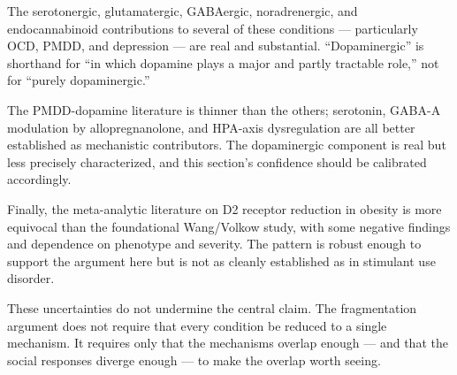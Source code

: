 The serotonergic, glutamatergic, GABAergic, noradrenergic, and endocannabinoid contributions to several of these conditions --- particularly OCD, PMDD, and depression --- are real and substantial. ``Dopaminergic'' is shorthand for ``in which dopamine plays a major and partly tractable role,'' not for ``purely dopaminergic.''

The PMDD-dopamine literature is thinner than the others; serotonin, GABA-A modulation by allopregnanolone, and HPA-axis dysregulation are all better established as mechanistic contributors. The dopaminergic component is real but less precisely characterized, and this section's confidence should be calibrated accordingly.

Finally, the meta-analytic literature on D2 receptor reduction in obesity is more equivocal than the foundational Wang/Volkow study, with some negative findings and dependence on phenotype and severity. The pattern is robust enough to support the argument here but is not as cleanly established as in stimulant use disorder.

These uncertainties do not undermine the central claim. The fragmentation argument does not require that every condition be reduced to a single mechanism. It requires only that the mechanisms overlap enough --- and that the social responses diverge enough --- to make the overlap worth seeing.
